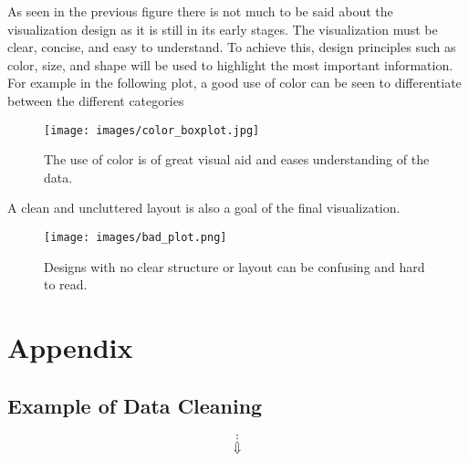 \documentclass[12pt, a4paper]{article}
\begin{document}
\par As seen in the previous figure there is not much to be said about the visualization design as it is still in its early stages.
The visualization must be clear, concise, and easy to understand. To achieve this, design principles such as color, size, and shape will be used to highlight the most important information.
For example in the following plot, a good use of color can be seen to differentiate between the different categories
\begin{figure}[!h]
    \centering
    \texttt{[image: images/color\_boxplot.jpg]}
    \caption{The use of color is of great visual aid and eases understanding of the data.}
\end{figure}

\par A clean and uncluttered layout is also a goal of the final visualization.

\begin{figure}[!h]
    \centering
    \texttt{[image: images/bad\_plot.png]}
    \caption{Designs with no clear structure or layout can be confusing and hard to read.}
\end{figure}



\newpage



\nocite{*}

\newpage

\section*{Appendix}
\subsection*{Example of Data Cleaning}

\begin{table}[h]
    \centering
\end{table}
$$\vdots$$
$$\Downarrow$$
\end{document}
